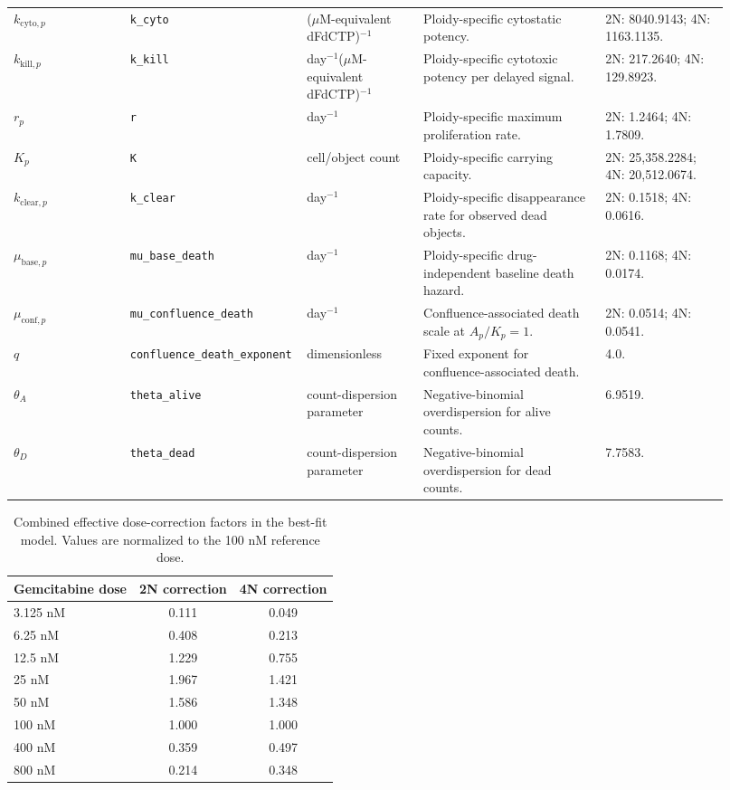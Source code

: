 \documentclass[11pt,notitlepage]{article}
\begin{document}
\begin{center}
\begin{tabular}{p{0.16\linewidth}p{0.18\linewidth}p{0.16\linewidth}p{0.25\linewidth}p{0.17\linewidth}}
$k_{\mathrm{cyto},p}$ & \texttt{k\_cyto} & ($\mu$M-equivalent dFdCTP)$^{-1}$ & Ploidy-specific cytostatic potency. & 2N: 8040.9143; 4N: 1163.1135. \\
$k_{\mathrm{kill},p}$ & \texttt{k\_kill} & day$^{-1}$($\mu$M-equivalent dFdCTP)$^{-1}$ & Ploidy-specific cytotoxic potency per delayed signal. & 2N: 217.2640; 4N: 129.8923. \\
$r_p$ & \texttt{r} & day$^{-1}$ & Ploidy-specific maximum proliferation rate. & 2N: 1.2464; 4N: 1.7809. \\
$K_p$ & \texttt{K} & cell/object count & Ploidy-specific carrying capacity. & 2N: 25,358.2284; 4N: 20,512.0674. \\
$k_{\mathrm{clear},p}$ & \texttt{k\_clear} & day$^{-1}$ & Ploidy-specific disappearance rate for observed dead objects. & 2N: 0.1518; 4N: 0.0616. \\
$\mu_{\mathrm{base},p}$ & \texttt{mu\_base\_death} & day$^{-1}$ & Ploidy-specific drug-independent baseline death hazard. & 2N: 0.1168; 4N: 0.0174. \\
$\mu_{\mathrm{conf},p}$ & \texttt{mu\_confluence\_death} & day$^{-1}$ & Confluence-associated death scale at $A_p/K_p=1$. & 2N: 0.0514; 4N: 0.0541. \\
$q$ & \texttt{confluence\_death\_exponent} & dimensionless & Fixed exponent for confluence-associated death. & 4.0. \\
$\theta_A$ & \texttt{theta\_alive} & count-dispersion parameter & Negative-binomial overdispersion for alive counts. & 6.9519. \\
$\theta_D$ & \texttt{theta\_dead} & count-dispersion parameter & Negative-binomial overdispersion for dead counts. & 7.7583. \\
\hline
\end{tabular}
\end{center}

\color{blue}

\begin{table}[htbp!]
\centering
\caption{Combined effective dose-correction factors in the best-fit model. Values are normalized to the 100 nM reference dose.}
\label{tab:effective_dose_scaling}
\begin{tabular}{lcc}
\toprule
Gemcitabine dose & 2N correction & 4N correction \\
\midrule
3.125 nM & 0.111 & 0.049 \\
6.25 nM & 0.408 & 0.213 \\
12.5 nM & 1.229 & 0.755 \\
25 nM & 1.967 & 1.421 \\
50 nM & 1.586 & 1.348 \\
100 nM & 1.000 & 1.000 \\
400 nM & 0.359 & 0.497 \\
800 nM & 0.214 & 0.348 \\
\bottomrule
\end{tabular}
\end{table}
\end{document}
